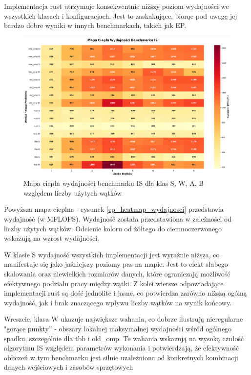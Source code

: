 Implementacja rust utrzymuje konsekwentnie niższy poziom wydajności we wszystkich klasach i konfiguracjach. Jest to zaskakujące, biorąc pod uwagę jej bardzo dobre wyniki w innych benchmarkach, takich jak EP.
\begin{figure}[H]
    \centering
    \includegraphics[width=\textwidth]{analiza/images/parallel/is/arm/is_mapa_ciepla_wydajnosci.png}
    \caption{Mapa ciepła wydajności benchmarku IS dla klas S, W, A, B względem liczby użytych wątków}
    \label{is_heatmap_wydajnosci}
\end{figure}
Powyższa mapa cieplna - rysunek \ref{ep_heatmap_wydajnosci} przedstawia wydajność (w MFLOPS). Wydajność została przedstawiona w zależności od liczby użytych wątków. Odcienie koloru od żółtego do ciemnoczerwonego wskazują na wzrost wydajności.

W klasie S wydajność wszystkich implementacji jest wyraźnie niższa, co manifestuje się jako jaśniejszy poziomy pas na mapie. Jest to efekt słabego skalowania oraz niewielkich rozmiarów danych, które ograniczają możliwość efektywnego podziału pracy między wątki. Z kolei wiersze odpowiadające implementacji rust są dość jednolite i jasne, co potwierdza zarówno niższą ogólną wydajność, jak i brak znaczącego wpływu liczby wątków na wynik końcowy.

Wreszcie, klasa W ukazuje największe wahania, co dobrze ilustrują nieregularne "gorące punkty” - obszary lokalnej maksymalnej wydajności wśród ogólnego spadku, szczególnie dla tbb i old\_omp. Te wahania wskazują na wysoką czułość algorytmu IS względem parametrów wykonania i potwierdzają, że efektywność obliczeń w tym benchmarku jest silnie uzależniona od konkretnych kombinacji danych wejściowych i zasobów sprzętowych

